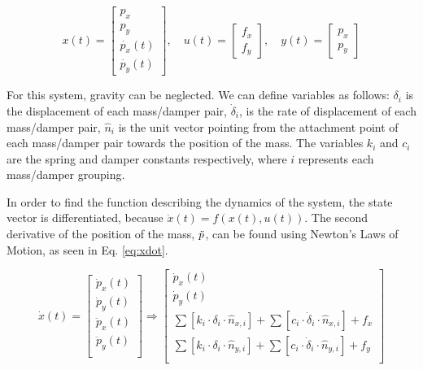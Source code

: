 \documentclass[../notes.tex]{subfiles}
\begin{document}
\begin{equation*} 
  x(t) =
  \begin{bmatrix}
  p_{x}\\ 
  p_{y}\\ 
  \dot{p_x}(t)\\ 
  \dot{p_y}(t) 
  \end{bmatrix},
\quad
  u(t) =
  \begin{bmatrix}
  f_{x}\\ 
  f_{y}
  \end{bmatrix},
\quad
  y(t) =
  \begin{bmatrix}
  p_{x}\\ 
  p_{y}
  \end{bmatrix}
\end{equation*}

For this system, gravity can be neglected. We can define variables as follows: $\delta_i$ is the displacement of each mass/damper pair, $\dot{\delta}_i$, is the rate of displacement of each mass/damper pair, $\hat{n}_i$ is the unit vector pointing from the attachment point of each mass/damper pair towards the position of the mass. The variables $k_i$ and $c_i$ are the spring and damper constants respectively, where $i$ represents each mass/damper grouping. 

In order to find the function describing the dynamics of the system, the state vector is differentiated, because $\dot{x}(t) = f(x(t), u(t))$. The second derivative of the position of the mass, $\Ddot{p}$, can be found using Newton's Laws of Motion, as seen in Eq. \ref{eq:xdot}.

\begin{equation} \label{eq:xdot}
    \dot{x}(t) = 
    \begin{bmatrix}
        \dot{p}_{x}(t) \\
        \dot{p}_{y}(t) \\
        \ddot{p}_{x}(t) \\
        \ddot{p}_{y}(t) \\
    \end{bmatrix}
    \Rightarrow
    \begin{bmatrix}
        \dot{p}_{x}(t) \\
        \dot{p}_{y}(t) \\
        \sum [k_i \cdot \delta_i \cdot \hat{n}_{x, i}] + \sum [c_i \cdot \dot{\delta}_i \cdot \hat{n}_{x, i}] + f_x \\
        \sum [k_i \cdot \delta_i \cdot \hat{n}_{y, i}] + \sum [c_i \cdot \dot{\delta}_i \cdot \hat{n}_{y, i}] + f_y \\
    \end{bmatrix}
\end{equation}
\end{document}
